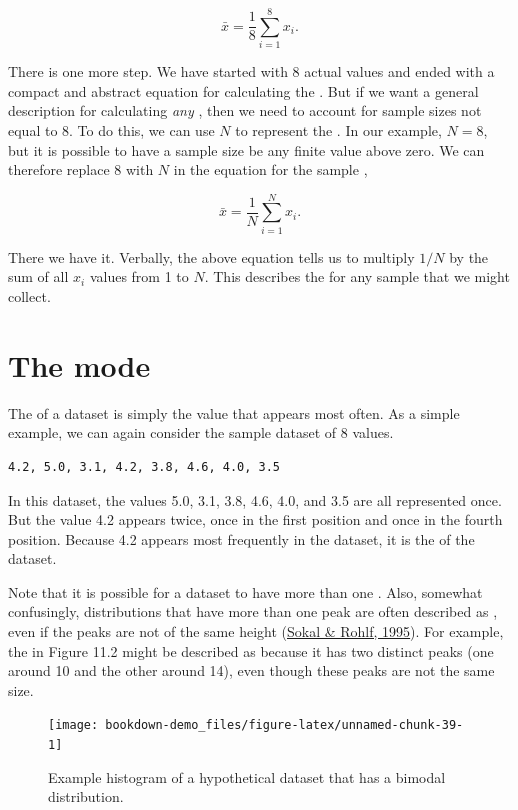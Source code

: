 \documentclass[
  openany]{krantz}
\begin{document}
\[\bar{x} = \frac{1}{8}\sum_{i = 1}^{8}x_{i}.\]

There is one more step.
We have started with 8 actual values and ended with a compact and abstract equation for calculating the .
But if we want a general description for calculating \emph{any} , then we need to account for sample sizes not equal to 8.
To do this, we can use \(N\) to represent the .
In our example, \(N = 8\), but it is possible to have a sample size be any finite value above zero.
We can therefore replace 8 with \(N\) in the equation for the sample ,

\[\bar{x} = \frac{1}{N}\sum_{i = 1}^{N}x_{i}.\]

There we have it.
Verbally, the above equation tells us to multiply \(1/N\) by the sum of all \(x_{i}\) values from 1 to \(N\).
This describes the  for any sample that we might collect.

\hypertarget{the-mode}{%
\section{The mode}\label{the-mode}}

The  of a dataset is simply the value that appears most often.
As a simple example, we can again consider the sample dataset of 8 values.

\begin{verbatim}
4.2, 5.0, 3.1, 4.2, 3.8, 4.6, 4.0, 3.5
\end{verbatim}

In this dataset, the values 5.0, 3.1, 3.8, 4.6, 4.0, and 3.5 are all represented once.
But the value 4.2 appears twice, once in the first position and once in the fourth position.
Because 4.2 appears most frequently in the dataset, it is the  of the dataset.

Note that it is possible for a dataset to have more than one .
Also, somewhat confusingly, distributions that have more than one peak are often described as , even if the peaks are not of the same height (\protect\hyperlink{ref-Sokal1995}{Sokal \& Rohlf, 1995}).
For example, the  in Figure 11.2 might be described as  because it has two distinct peaks (one around 10 and the other around 14), even though these peaks are not the same size.

\begin{figure}
\texttt{[image: bookdown-demo\_files/figure-latex/unnamed-chunk-39-1]} \caption{Example histogram of a hypothetical dataset that has a bimodal distribution.}\label{fig:unnamed-chunk-39}
\end{figure}
\end{document}
